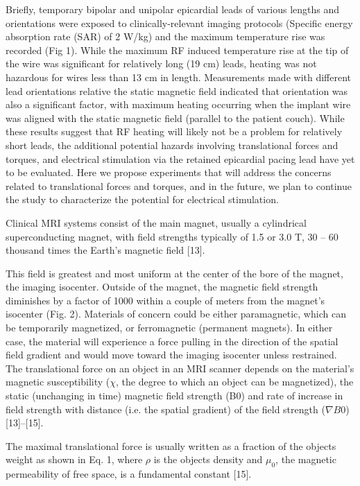 Briefly,
temporary bipolar and unipolar epicardial leads of various lengths and
orientations were exposed to clinically-relevant imaging protocols
(Specific energy absorption rate (SAR) of 2 W/kg) and the maximum
temperature rise was recorded (Fig 1). While the maximum RF induced
temperature rise at the tip of the wire was significant for relatively long
(19 cm) leads, heating was not hazardous for wires less than 13 cm in
length. Measurements made with different lead orientations relative the
static magnetic field indicated that orientation was also a significant
factor, with maximum heating occurring when the implant wire was
aligned with the static magnetic field (parallel to the patient couch).
While these results suggest that RF heating will likely not be a problem
for relatively short leads, the additional potential hazards involving
translational forces and torques, and electrical stimulation via the retained
epicardial pacing lead have yet to be evaluated. Here we propose
experiments that will address the concerns related to translational forces
and torques, and in the future, we plan to continue the study to
characterize the potential for electrical stimulation.


Clinical MRI systems consist of the main magnet, usually a cylindrical
superconducting magnet, with field strengths typically of 1.5 or 3.0 T, 30 –
60 thousand times the Earth’s magnetic field [13]. 

This field is greatest and
most uniform at the center of the bore of the magnet, the imaging isocenter.
Outside of the magnet, the magnetic field strength diminishes by a factor of
1000 within a couple of meters from the magnet’s isocenter (Fig. 2).
Materials of concern could be either paramagnetic, which can be temporarily
magnetized, or ferromagnetic (permanent magnets). In either case, the
material will experience a force pulling in the direction of the spatial field
gradient and would move toward the imaging isocenter unless restrained.
The translational force on an object in an MRI scanner depends on the material’s
magnetic susceptibility ($\chi$, the degree to which an object can be magnetized),
the static (unchanging in time) magnetic field strength (B0) and rate of increase
in field strength with distance (i.e. the spatial gradient) of the field strength
($\nabla B0$) [13]–[15]. 

The maximal translational force is usually written as a
fraction of the objects weight as shown in Eq. 1, where $\rho$ is the objects
density and $\mu_0$, the magnetic permeability of free space, is a fundamental
constant [15].

